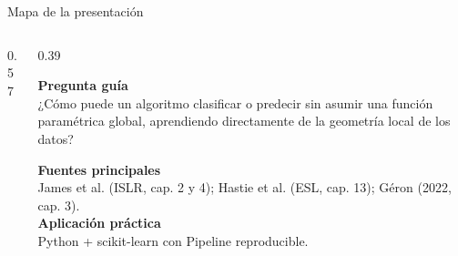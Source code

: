 \documentclass[aspectratio=169,11pt,table]{beamer}
\begin{document}
\begin{frame}{Mapa de la presentación}
\begin{columns}[T,onlytextwidth]
\begin{column}{0.57\textwidth}
{\small\tableofcontents}
\end{column}
\begin{column}{0.39\textwidth}
\begin{keybox}
\textbf{Pregunta guía}\\[0.14cm]
¿Cómo puede un algoritmo clasificar o predecir sin asumir una función paramétrica global, aprendiendo directamente de la geometría local de los datos?
\end{keybox}
\vspace{0.16cm}
\begin{ccdebox}
\small
\textbf{Fuentes principales}\\
James et al. (ISLR, cap. 2 y 4); Hastie et al. (ESL, cap. 13); Géron (2022, cap. 3).\\[0.12cm]
\textbf{Aplicación práctica}\\
Python + scikit-learn con Pipeline reproducible.
\end{ccdebox}
\end{column}
\end{columns}
\end{frame}








\end{document}
